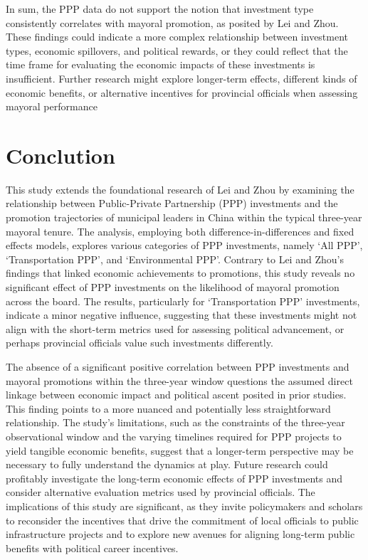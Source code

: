 \documentclass[12pt, ]{article}
\newenvironment{CSLReferences}[2]{

\clearpage
}{}
\begin{document}
In sum, the PPP data do not support the notion that investment type
consistently correlates with mayoral promotion, as posited by Lei and
Zhou. These findings could indicate a more complex relationship between
investment types, economic spillovers, and political rewards, or they
could reflect that the time frame for evaluating the economic impacts of
these investments is insufficient. Further research might explore
longer-term effects, different kinds of economic benefits, or
alternative incentives for provincial officials when assessing mayoral
performance

\hypertarget{conclution}{%
\section{Conclution}\label{conclution}}

This study extends the foundational research of Lei and Zhou by
examining the relationship between Public-Private Partnership (PPP)
investments and the promotion trajectories of municipal leaders in China
within the typical three-year mayoral tenure. The analysis, employing
both difference-in-differences and fixed effects models, explores
various categories of PPP investments, namely `All PPP', `Transportation
PPP', and `Environmental PPP'. Contrary to Lei and Zhou's findings that
linked economic achievements to promotions, this study reveals no
significant effect of PPP investments on the likelihood of mayoral
promotion across the board. The results, particularly for
`Transportation PPP' investments, indicate a minor negative influence,
suggesting that these investments might not align with the short-term
metrics used for assessing political advancement, or perhaps provincial
officials value such investments differently.

The absence of a significant positive correlation between PPP
investments and mayoral promotions within the three-year window
questions the assumed direct linkage between economic impact and
political ascent posited in prior studies. This finding points to a more
nuanced and potentially less straightforward relationship. The study's
limitations, such as the constraints of the three-year observational
window and the varying timelines required for PPP projects to yield
tangible economic benefits, suggest that a longer-term perspective may
be necessary to fully understand the dynamics at play. Future research
could profitably investigate the long-term economic effects of PPP
investments and consider alternative evaluation metrics used by
provincial officials. The implications of this study are significant, as
they invite policymakers and scholars to reconsider the incentives that
drive the commitment of local officials to public infrastructure
projects and to explore new avenues for aligning long-term public
benefits with political career incentives.

\hypertarget{refs}{}

\begin{CSLReferences}{0}{0}\end{CSLReferences}


\end{document}
